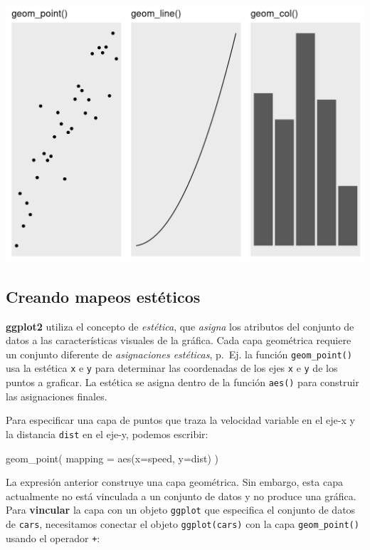 \documentclass[
]{book}
\newenvironment{Shaded}{\begin{snugshade}}{\end{snugshade}}
\newcommand{\AttributeTok}[1]{\textcolor[rgb]{0.77,0.63,0.00}{#1}}
\newcommand{\FunctionTok}[1]{\textcolor[rgb]{0.00,0.00,0.00}{#1}}
\newcommand{\NormalTok}[1]{#1}
\begin{document}
\includegraphics{img/geom.png}

\hypertarget{creando-mapeos-estuxe9ticos}{%
\subsection{Creando mapeos estéticos}\label{creando-mapeos-estuxe9ticos}}

\textbf{ggplot2} utiliza el concepto de \emph{estética}, que \emph{asigna} los atributos del conjunto de datos a las características visuales de la gráfica. Cada capa geométrica requiere un conjunto diferente de \emph{asignaciones estéticas}, p.~Ej. la función \texttt{geom\_point()} usa la estética \texttt{x} e \texttt{y} para determinar las coordenadas de los ejes \texttt{x} e \texttt{y} de los puntos a graficar. La estética se asigna dentro de la función \texttt{aes()} para construir las asignaciones finales.

Para especificar una capa de puntos que traza la velocidad variable en el eje-x y la distancia \texttt{dist} en el eje-y, podemos escribir:

\begin{Shaded}
\begin{Highlighting}[]
\FunctionTok{geom\_point}\NormalTok{(}
  \AttributeTok{mapping =} \FunctionTok{aes}\NormalTok{(}\AttributeTok{x=}\NormalTok{speed, }\AttributeTok{y=}\NormalTok{dist)}
\NormalTok{)}
\end{Highlighting}
\end{Shaded}

La expresión anterior construye una capa geométrica. Sin embargo, esta capa actualmente no está vinculada a un conjunto de datos y no produce una gráfica. Para \textbf{vincular} la capa con un objeto \texttt{ggplot} que especifica el conjunto de datos de \texttt{cars}, necesitamos conectar el objeto \texttt{ggplot(cars)} con la capa \texttt{geom\_point()} usando el operador \texttt{+}:
\end{document}
